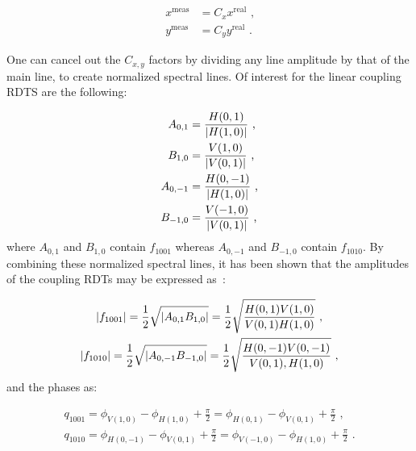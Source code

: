 \begin{equation}
  \begin{aligned}
    x^{\mathrm{meas}} &= C_x x^{\mathrm{real}}  \text{ ,}  \\
    y^{\mathrm{meas}} &= C_y y^{\mathrm{real}}  \text{ .}
  \end{aligned}
\end{equation}

One can cancel out the \(C_{x,y}\) factors by dividing any line amplitude by that of the main line, to create normalized spectral lines.
Of interest for the linear coupling RDTS are the following:

\begin{equation}
  \begin{aligned}
    A_{0,1} &= \frac{H(0,1)}{\left\lvert H(1,0) \right\rvert}    \text{ ,}  \\
    B_{1,0} &= \frac{V(1,0)}{\left\lvert V(0,1) \right\rvert}    \text{ ,}  \\
    A_{0,-1} &= \frac{H(0,-1)}{\left\lvert H(1,0) \right\rvert}  \text{ ,}  \\
    B_{-1,0} &= \frac{V(-1,0)}{\left\lvert V(0,1) \right\rvert}  \text{ ,}
  \end{aligned}
  \label{equation:normalized_spectral_lines}
\end{equation}
where \(A_{0,1}\) and \(B_{1,0}\) contain \(f_{1001}\) whereas \(A_{0,-1}\) and \(B_{-1,0}\) contain \(f_{1010}\).
By combining these normalized spectral lines, it has been shown that the amplitudes of the coupling RDTs may be expressed as~\cite{CERN:Franchi:Computation_Coupling_Resonance_Driving_Term_Single_BPM,PRAB:Tomas:CERN_LHC_OMC}:

\begin{equation}
  \begin{gathered}
    \left\lvert f_{1001} \right\rvert = \frac{1}{2} \sqrt{\left\lvert A_{0,1} B_{1,0} \right\rvert}   = \frac{1}{2} \sqrt{\frac{H(0,1) V(1,0)}{V(0,1) H(1,0)}}       \text{ ,}  \\
    \left\lvert f_{1010} \right\rvert = \frac{1}{2} \sqrt{\left\lvert A_{0,-1} B_{-1,0} \right\rvert} = \frac{1}{2} \sqrt{\frac{H(0,-1) V(0,-1)}{V(0,1), H(1,0)}}  \text{ ,}
  \end{gathered}
  \label{equation:coupling_rdts_amplitude_from_spectral_lines}
\end{equation}
and the phases as:

\begin{equation}
  \begin{gathered}
    q_{1001} = \phi_{V(1,0)} -\phi_{H(1,0)} +\frac{\pi}{2} = \phi_{H(0,1)} - \phi_{V(0,1)} + \frac{\pi}{2}      \text{ ,}  \\
    q_{1010} = \phi_{H(0,-1)} -\phi_{V(0,1)} +\frac{\pi}{2} = \phi_{V(-1,0)} - \phi_{H(1,0)} + \frac{\pi}{2}    \text{ .}
  \end{gathered}
  \label{equation:coupling_rdts_phase_from_spectral_lines}
\end{equation}

